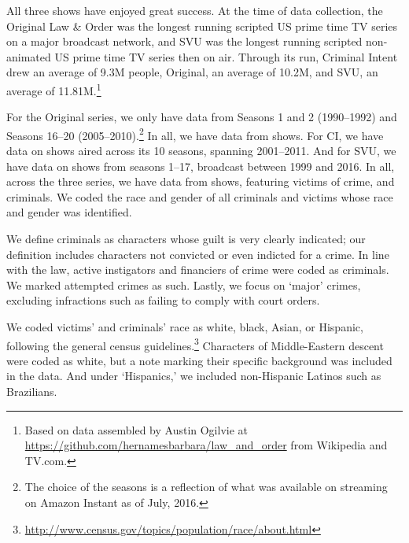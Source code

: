 \documentclass[11pt, letterpaper]{article}
\begin{document}
All three shows have enjoyed great success. At the time of data collection, the Original Law \& Order was the longest running scripted US prime time TV series on a major broadcast network, and SVU was the longest running scripted non-animated US prime time TV series then on air. Through its run, Criminal Intent drew an average of 9.3M people, Original, an average of 10.2M, and SVU, an average of 11.81M.\footnote{Based on data assembled by Austin Ogilvie at \href{https://github.com/hernamesbarbara/law_and_order}{https://github.com/hernamesbarbara/law\_and\_order} from Wikipedia and TV.com.}

For the Original series, we only have data from Seasons 1 and 2 (1990--1992) and Seasons 16--20 (2005--2010).\footnote{The choice of the seasons is a reflection of what was available on streaming on Amazon Instant as of July, 2016.} In all, we have data from \OriginalEpisodeCount{} shows. For CI, we have data on \CriminalIntentEpisodeCount{} shows aired across its 10 seasons, spanning 2001--2011. And for SVU, we have data on \SvuEpisodeCount{} shows from seasons 1--17, broadcast between 1999 and 2016. In all, across the three series, we have data from \EpisodeCount{} shows, featuring \VictimCount{} victims of crime, and \CriminalCount{} criminals. We coded the race and gender of all criminals and victims whose race and gender was identified.

We define criminals as characters whose guilt is very clearly indicated; our definition includes characters not convicted or even indicted for a crime. In line with the law, active instigators and financiers of crime were coded as criminals. We marked attempted crimes as such. Lastly, we focus on `major' crimes, excluding infractions such as failing to comply with court orders.

We coded victims' and criminals' race as white, black, Asian, or Hispanic, following the general census guidelines.\footnote{\url{http://www.census.gov/topics/population/race/about.html}} Characters of Middle-Eastern descent were coded as white, but a note marking their specific background was included in the data. And under `Hispanics,' we included non-Hispanic Latinos such as Brazilians.
\end{document}

